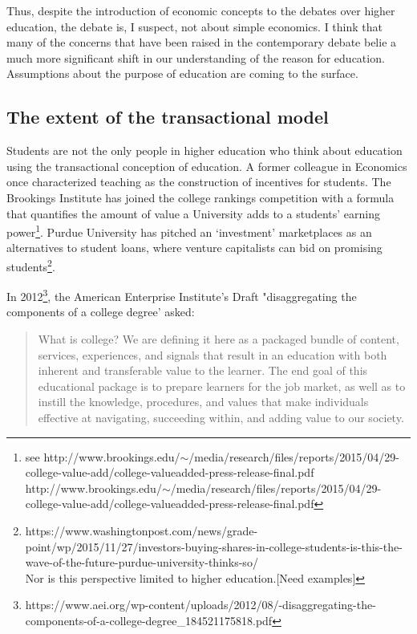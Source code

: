 Thus, despite the introduction of economic concepts to the debates over higher education, the debate is, I suspect, not about simple economics. I think that many of the concerns that have been raised in the contemporary debate belie a much more significant shift in our understanding of the reason for education. Assumptions about the purpose of education are coming to the surface.

\subsection{The extent of the transactional model}
\label{theextentofthetransactionalmodel}

Students are not the only people in higher education who think about education using the transactional conception of education. A former colleague in Economics once characterized teaching as the construction of incentives for students. The Brookings Institute has joined the college rankings competition with a formula that quantifies the amount of value a University adds to a students' earning power\footnote{see http:\slash \slash www.brookings.edu\slash \ensuremath{\sim}\slash media\slash research\slash files\slash reports\slash 2015\slash 04\slash 29-college-value-add\slash college-valueadded-press-release-final.pdf
http:\slash \slash www.brookings.edu\slash \ensuremath{\sim}\slash media\slash research\slash files\slash reports\slash 2015\slash 04\slash 29-college-value-add\slash college-valueadded-press-release-final.pdf}. Purdue University has pitched an `investment' marketplaces as an alternatives to student loans, where venture capitalists can bid on promising students\footnote{https:\slash \slash www.washingtonpost.com\slash news\slash grade-point\slash wp\slash 2015\slash 11\slash 27\slash investors-buying-shares-in-college-students-is-this-the-wave-of-the-future-purdue-university-thinks-so\slash \\
Nor is this perspective limited to higher education.[Need examples]}. 

In 2012\footnote{https:\slash \slash www.aei.org\slash wp-content\slash uploads\slash 2012\slash 08\slash -disaggregating-the-components-of-a-college-degree\_184521175818.pdf}, the American Enterprise Institute's Draft "disaggregating the components of a college degree' asked:

\begin{quote}

What is college? We are defining it here as a packaged bundle of content, services, experiences, and signals that result in an education with both inherent and transferable value to the learner. The end goal of this educational package is to prepare learners for the job market, as well as to instill the knowledge, procedures, and values that make individuals effective at navigating, succeeding within, and adding value to our society. 
\end{quote}

